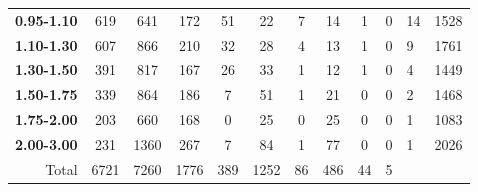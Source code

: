 \begin{table}
\begin{tabular}{r|cccccccccll}
\textbf{0.95-1.10}        & 619                         & 641                         & 172                         & 51                       & 22                         & 7                          & 14                         & 1                        & 0                          & 14     & 1528  \\
\textbf{1.10-1.30}        & 607                         & 866                         & 210                         & 32                       & 28                         & 4                          & 13                         & 1                        & 0                          & 9      & 1761  \\
\textbf{1.30-1.50}        & 391                         & 817                         & 167                         & 26                       & 33                         & 1                          & 12                         & 1                        & 0                          & 4      & 1449  \\
\textbf{1.50-1.75}        & 339                         & 864                         & 186                         & 7                        & 51                         & 1                          & 21                         & 0                        & 0                          & 2      & 1468  \\
\textbf{1.75-2.00}        & 203                         & 660                         & 168                         & 0                        & 25                         & 0                          & 25                         & 0                        & 0                          & 1      & 1083  \\
\textbf{2.00-3.00}        & 231                         & 1360                        & 267                         & 7                        & 84                         & 1                          & 77                         & 0                        & 0                          & 1      & 2026  \\ \hline
Total                     & 6721                        & 7260                        & 1776                        & 389                      & 1252                       & 86                         & 486                        & 44                       & 5                          &        &      
\end{tabular}
\end{table}



